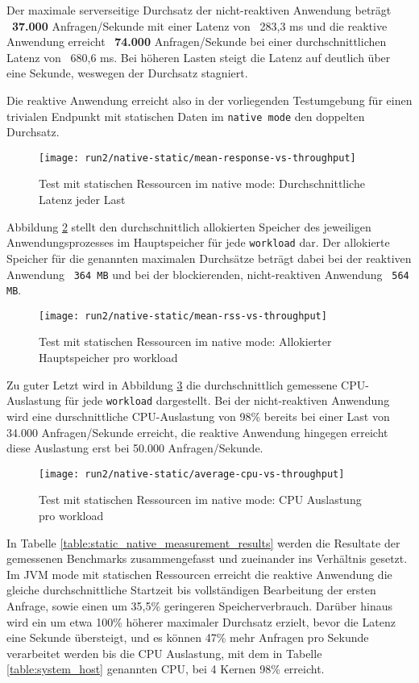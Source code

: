 Der maximale serverseitige Durchsatz der nicht-reaktiven Anwendung beträgt ~\textbf{37.000} Anfragen/Sekunde mit einer
Latenz von ~283,3 ms und
die reaktive Anwendung erreicht ~\textbf{74.000} Anfragen/Sekunde bei einer durchschnittlichen Latenz von ~680,6 ms.
Bei höheren Lasten steigt die Latenz auf deutlich über eine Sekunde, weswegen der Durchsatz stagniert.

Die reaktive Anwendung erreicht also in der vorliegenden Testumgebung für einen trivialen
Endpunkt mit statischen Daten im \verb|native mode| den doppelten Durchsatz.
\newpage
\begin{figure}[ht!]
    \centering
    \texttt{[image: run2/native-static/mean-response-vs-throughput]}
    \caption{Test mit statischen Ressourcen im native mode: Durchschnittliche Latenz jeder Last}
    \label{fig:native_static_mean_response}
\end{figure}
Abbildung \ref{fig:native_static_mean_rss} stellt den durchschnittlich allokierten Speicher des jeweiligen Anwendungsprozesses
im Hauptspeicher für jede \verb|workload| dar. Der allokierte Speicher für die genannten maximalen Durchsätze beträgt dabei bei
der reaktiven Anwendung ~\verb|364 MB| und bei der blockierenden, nicht-reaktiven Anwendung ~\verb|564 MB|.
\newpage
\begin{figure}[ht!]
    \centering
    \texttt{[image: run2/native-static/mean-rss-vs-throughput]}
    \caption{Test mit statischen Ressourcen im native mode: Allokierter Hauptspeicher pro workload}
    \label{fig:native_static_mean_rss}
\end{figure}

Zu guter Letzt wird in Abbildung \ref{fig:native_static_avg_cpu} die durchschnittlich gemessene CPU-Auslastung für jede \verb|workload|
dargestellt. Bei der nicht-reaktiven Anwendung wird eine durschnittliche CPU-Auslastung von 98\% bereits bei einer Last von
34.000 Anfragen/Sekunde erreicht, die reaktive Anwendung hingegen erreicht diese Auslastung erst bei 50.000 Anfragen/Sekunde.
\newpage
\begin{figure}[ht!]
    \centering
    \texttt{[image: run2/native-static/average-cpu-vs-throughput]}
    \caption{Test mit statischen Ressourcen im native mode: CPU Auslastung pro workload}
    \label{fig:native_static_avg_cpu}
\end{figure}

In Tabelle \ref{table:static_native_measurement_results} werden die Resultate der gemessenen Benchmarks zusammengefasst
und zueinander ins Verhältnis gesetzt. Im JVM mode mit statischen Ressourcen erreicht die reaktive Anwendung
die gleiche durchschnittliche Startzeit bis vollständigen Bearbeitung der ersten Anfrage, sowie
einen um 35,5\% geringeren Speicherverbrauch.
Darüber hinaus wird ein um etwa 100\% höherer maximaler Durchsatz erzielt, bevor die Latenz eine Sekunde übersteigt, und
es können 47\% mehr Anfragen pro Sekunde verarbeitet werden bis die CPU Auslastung, mit dem in Tabelle \ref{table:system_host}
genannten CPU, bei 4 Kernen 98\% erreicht.


